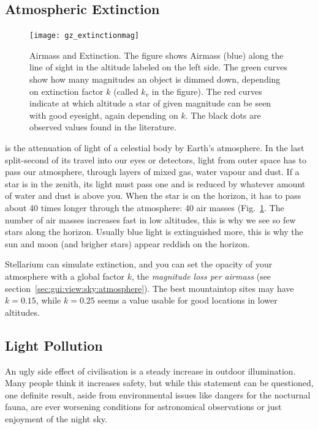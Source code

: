 \subsection{Atmospheric Extinction}
\label{sec:phenomena:Extinction}

\begin{figure}[tb]
\centering\texttt{[image: gz\_extinctionmag]}
\caption{Airmass and Extinction.  The figure shows Airmass (blue)
  along the line of sight in the altitude labeled on the left side.
  The green curves show how many magnitudes an object is dimmed down,
  depending on extinction factor $k$ (called $k_v$ in the figure). The
  red curves indicate at which altitude a star of given magnitude can
  be seen with good eyesight, again depending on $k$. The black dots
  are observed values found in the literature.}
\label{fig:Extinction}
\end{figure}

 is the attenuation of light of a
celestial body by Earth's atmosphere. In the last split-second of its
travel into our eyes or detectors, light from outer space has to pass
our atmosphere, through layers of mixed gas, water vapour and dust. If
a star is in the zenith, its light must pass one 
and is reduced by whatever amount of water and dust is above you. When
the star is on the horizon, it has to pass about 40 times longer
through the atmosphere: 40 air masses (Fig.~\ref{fig:Extinction}. The
number of air masses increases fast in low altitudes, this is why we
see so few stars along the horizon. Usually blue light is extinguished
more, this is why the sun and moon (and brigher stars) appear reddish
on the horizon.

Stellarium can simulate extinction, and you can set the opacity of
your atmosphere with a global factor $k$, the \emph{magnitude loss per
  airmass} (see section~\ref{sec:gui:view:sky:atmosphere}). The best
mountaintop sites may have $k=0.15$, while $k=0.25$ seems a value
usable for good locations in lower altitudes.

\subsection{Light Pollution}
\label{sec:phenomena:LightPollution}

An ugly side effect of civilisation is a steady increase in outdoor
illumination. Many people think it increases safety, but while this
statement can be questioned, one definite result, aside from
environmental issues like dangers for the nocturnal fauna, are ever
worsening conditions for astronomical observations or just enjoyment
of the night sky. 

